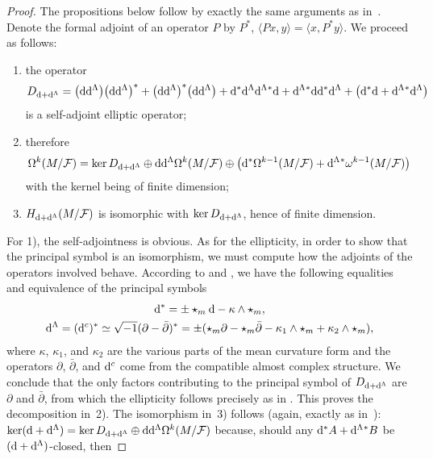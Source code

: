 \documentclass[pdftex]{sigma}
\numberwithin{equation}{section}
\begin{document}
\begin{proof}
The propositions below follow by exactly the same arguments as in~\cite{tseng}. Denote the formal adjoint of an operator $P$ by $P^*$, $\langle Px,y\rangle=\langle x,P^*y\rangle$. We proceed as follows:
\begin{enumerate}\itemsep=0pt
\item[1)] the operator
\begin{gather*}
D_{{\rm d}+{\rm d}^{\Lambda}}= \big({\rm d}{\rm d}^{\Lambda}\big)\big({\rm d}{\rm d}^{\Lambda}\big)^* + \big({\rm d}{\rm d}^{\Lambda}\big)^*\big({\rm d}{\rm d}^{\Lambda}\big)+{\rm d}^*{\rm d}^{\Lambda}{\rm d}^{\Lambda}{}^*{\rm d} + {\rm d}^{\Lambda}{}^*{\rm d}{\rm d}^*{\rm d}^{\Lambda} + \big({\rm d}^*{\rm d} +{\rm d}^{\Lambda}{}^*{\rm d}^{\Lambda}\big)
\end{gather*}
is a self-adjoint elliptic operator;
\item[2)] therefore
\begin{gather*}
\Omega^k(M\slash \mathcal{F})= \ker D_{{\rm d}+{\rm d}^{\Lambda}}\oplus {\rm d}{\rm d}^{\Lambda}\Omega^k(M\slash\mathcal{F}) \oplus \big({\rm d}^*\Omega^{k-1}(M\slash\mathcal{F})+{\rm d}^{\Lambda}{}^*\omega^{k-1}(M\slash\mathcal{F})\big)
\end{gather*}
with the kernel being of finite dimension;
\item[3)] $H_{{\rm d}+{\rm d}^{\Lambda}}(M\slash\mathcal{F})$ is isomorphic with $\ker D_{{\rm d}+{\rm d}^{\Lambda}}$, hence of finite dimension.
\end{enumerate}
For 1), the self-adjointness is obvious. As for the ellipticity, in order to show that the principal symbol is an isomorphism, we must compute how the adjoints of the operators involved behave. According to \cite[Proposition~3.3]{tseng} and \cite[Proposition~3.1]{pawel}, we have the following equalities and equivalence of the principal symbols
\begin{gather*}
{\rm d}^*= \pm \star_{m}{\rm d} - \kappa\wedge\star_{m},\\
{\rm d}^{\Lambda}=({\rm d}^{c})^*\simeq \sqrt{-1}(\partial -\bar{\partial})^*=\pm(\star_m\partial - \star_{m}\bar{\partial} -\kappa_1\wedge \star_{m} + \kappa_2\wedge \star_{m}),
\end{gather*}
where $\kappa$, $\kappa_1$, and $\kappa_2$ are the various parts of the mean curvature form and the operators $\partial$, $\bar{\partial}$, and ${\rm d}^{c}$ come from the compatible almost complex structure. We conclude that the only factors contributing to the principal symbol of $D_{{\rm d}+{\rm d}^{\Lambda}}$ are $\partial$ and $\bar{\partial}$, from which the ellipticity follows precisely as in \cite[Theorem~3.5]{tseng}. This proves the decomposition in~2). The isomorphism in~3) follows (again, exactly as in~\cite{tseng}): $\ker ({\rm d}+{\rm d}^{\Lambda})=\ker D_{{\rm d}+{\rm d}^{\Lambda}}\oplus {\rm d}{\rm d}^{\Lambda}\Omega^k(M\slash\mathcal{F})$ because, should any ${\rm d}^*A+{\rm d}^{\Lambda}{}^*B$ be $({\rm d}+{\rm d}^{\Lambda})$-closed, then

\end{proof}
\end{document}
